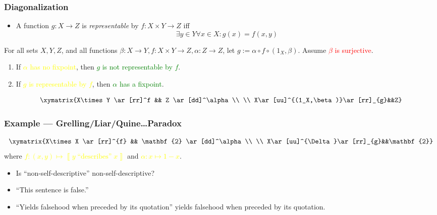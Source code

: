 \documentclass[UTF8,aspectratio=43,11pt,colorlinks,compress,openany]{beamer}%
\begin{document}
\begin{frame}\frametitle{Diagonalization}
	\begin{itemize}
		\item A function $g: X\to Z$ is \emph{representable} by $f: X\times Y\to Z$ iff
		\[\exists y\in Y\forall x\in X: g(x)=f(x,y)\]
	\end{itemize}
\setlength\abovedisplayskip{0pt}
\setlength\belowdisplayskip{0pt}
	\begin{theorem}
		For all sets $X, Y, Z$, and all functions $\beta: X\to Y, f: X\times Y\to Z, \alpha: Z\to Z$, let $g:=\alpha\circ f\circ(1_X,\beta)$. Assume \textcolor{red}{$\beta$ is surjective}. 
		\begin{enumerate}
			\item If \textcolor{yellow}{$\alpha$ has no fixpoint}, then \textcolor{green}{$g$ is not representable by $f$}.
			\item If \textcolor{yellow}{$g$ is representable by $f$}, then \textcolor{green}{$\alpha$ has a fixpoint}.
		\end{enumerate}
	\end{theorem}
	\[\xymatrix{X\times Y
	\ar[rr]^f && Z \ar[dd]^\alpha\\
	\\
	X\ar[uu]^{(1_X,\beta)}\ar[rr]_{g}&&Z}\]
\end{frame}

\begin{frame}\frametitle{Example --- Grelling/Liar/Quine\dots Paradox}
\setlength\abovedisplayskip{0pt}
\setlength\belowdisplayskip{0pt}
	\[\xymatrix{X\times X
		\ar[rr]^{f} && \mathbf{2} \ar[dd]^\alpha
		\\
		\\
		X\ar[uu]^{\Delta}\ar[rr]_{g}&&\mathbf{2}}\]
	where \textcolor{yellow}{$f: (x,y)\mapsto\left\llbracket y\;\mbox{``describes''}\;x\right\rrbracket$} and \textcolor{yellow}{$\alpha: x\mapsto 1-x$}.
	\begin{itemize}
		\item Is ``non-self-descriptive'' non-self-descriptive?
		\item ``This sentence is false.''
		\item ``Yields falsehood when preceded by its quotation'' yields falsehood when preceded by its quotation.
	\end{itemize}
\end{frame}
\end{document}
